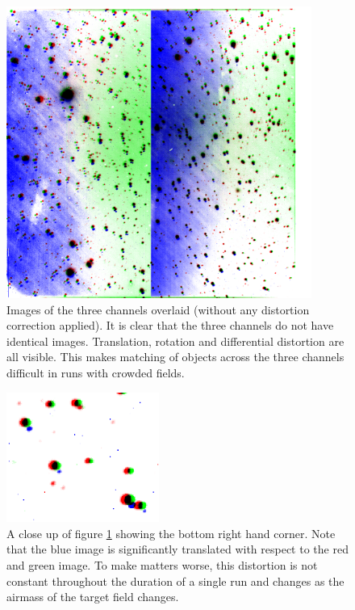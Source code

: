 \begin{figure}
  \centering
  \includegraphics[width=100mm]{images/overlay_multiply.png}
  \caption{Images of the three channels overlaid (without any distortion correction applied). It is clear that the three channels do not have identical images. Translation, rotation and differential distortion are all visible. This makes matching of objects across the three channels difficult in runs with crowded fields. }
\label{fig:nonoverlap}
\end{figure}

\begin{figure}
  \centering
  \includegraphics[width=50mm]{images/overlay_multiply_closeup.png}
  \caption{A close up of figure \ref{fig:nonoverlap} showing the bottom right hand corner. Note that the blue image is significantly translated with respect to the red and green image. To make matters worse, this distortion is not constant throughout the duration of a single run and changes as the airmass of the target field changes.}
\label{fig:nonoverlapzoom}
\end{figure}

